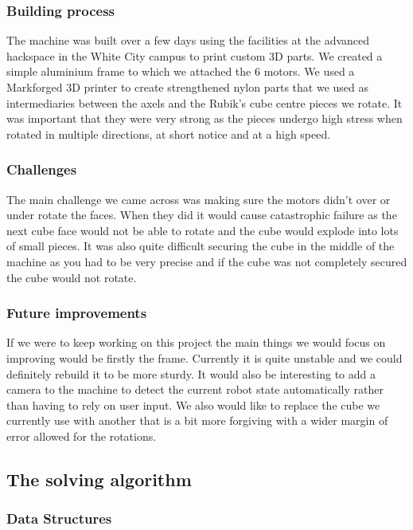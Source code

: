 \documentclass[8pt]{article}
\begin{document}
\subsubsection{Building process} 

The machine was built over a few days using the facilities at the advanced 
hackspace in the White City campus to print custom 3D parts. We created a simple
aluminium frame to which we attached the 6 motors. We used a Markforged 
3D printer to create strengthened nylon parts that we used as intermediaries 
between the axels and the Rubik's cube centre pieces we rotate. It was important that 
they were very strong as the pieces undergo high stress when rotated in 
multiple directions, at short notice and at a high speed.
\subsubsection{Challenges} 

The main challenge we came across was making sure the motors didn't over or under 
rotate the faces. When they did it would cause catastrophic failure as the next 
cube face would not be able to rotate and the cube would explode into lots of small 
pieces. It was also quite difficult securing the cube in the middle of the machine 
as you had to be very precise and if the cube was not completely secured the cube 
would not rotate.

\subsubsection{Future improvements}

If we were to keep working on this project the main things we would focus 
on improving would be firstly the frame. Currently it is quite unstable and we 
could definitely rebuild it to be more sturdy. It would also be interesting to 
add a camera to the machine to detect the current robot state automatically rather 
than having to rely on user input. We also would like to replace the cube we currently 
use with another that is a bit more forgiving with a wider margin of error allowed
for the rotations.

\subsection{The solving algorithm}
\subsubsection{Data Structures}
\end{document}
